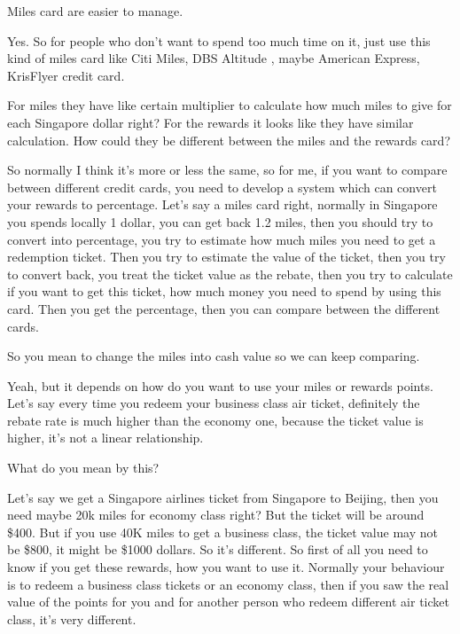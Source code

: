 \begin{description}[leftmargin=4em,style=nextline]
	\item[JH:] Miles card are easier to manage.

	\item[HJ:] Yes. So for people who don’t want to spend too much time on it, just use this kind of miles card like Citi Miles, DBS Altitude , maybe American Express, KrisFlyer credit card.

	\item[JH:] For miles they have like certain multiplier to calculate how much miles to give for each Singapore dollar right? For the rewards it looks like they have similar calculation. How could they be different between the miles and the rewards card?

	\item[HJ:] So normally I think it’s more or less the same, so for me, if you want to compare between different credit cards, you need to develop a system which can convert your rewards to percentage. Let’s say a miles card right, normally in Singapore you spends locally 1 dollar, you can get back 1.2 miles, then you should try to convert into percentage, you try to estimate how much miles you need to get a redemption ticket. Then you try to estimate the value of the ticket, then you try to convert back, you treat the ticket value as the rebate, then you try to calculate if you want to get this ticket, how much money you need to spend by using this card. Then you get the percentage, then you can compare between the different cards.

	\item[JH:] So you mean to change the miles into cash value so we can keep comparing.

	\item[HJ:] Yeah, but it depends on how do you want to use your miles or rewards points. Let’s say every time you redeem your business class air ticket, definitely the rebate rate is much higher than the economy one, because the ticket value is higher, it’s not a linear relationship.

	\item[JH:] What do you mean by this?

	\item[HJ:] Let’s say we get a Singapore airlines ticket from Singapore to Beijing, then you need maybe 20k miles for economy class right? But the ticket will be around \$400. But if you use 40K miles to get a business class, the ticket value may not be \$800, it might be \$1000 dollars. So it’s different. So first of all you need to know if you get these rewards, how you want to use it. Normally your behaviour is to redeem a business class tickets or an economy class, then if you saw the real value of the points for you and for another person who redeem different air ticket class, it’s very different.


\end{description}
